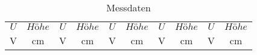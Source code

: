 \documentclass[captions=tableheading]{scrartcl}
\begin{document}
\begin{landscape}


\begin{table}
  \centering
  \caption{Messdaten}
  \label{tab:V501}
  \begin{tabular}{c c c c c c c c c c}
    \toprule
    $U$ & $Höhe$ & $U$ & $Höhe$ & $U$ & $Höhe$ & $U$ & $Höhe$ & $U$ & $Höhe$\\
      V &     cm &   V &     cm &   V &    cm  &  V  &  cm    &  V  & cm \\
    \midrule
      
    \bottomrule
  \end{tabular}
\end{table}

\end{landscape}
\end{document}
